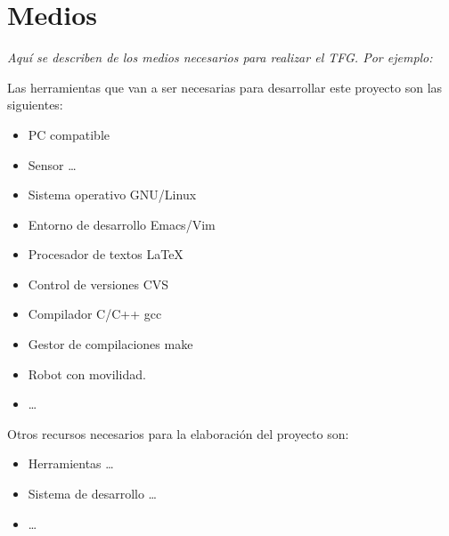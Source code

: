\documentclass{article}
\begin{document}
\section{Medios}
\label{sec:medios}

\textit{Aquí se describen de los medios necesarios para realizar el TFG. Por
  ejemplo:}

Las herramientas que van a ser necesarias para desarrollar este proyecto
son las siguientes:

\begin{itemize}
\item PC compatible
\item Sensor  \ldots
\item Sistema operativo GNU/Linux~\cite{gnulinux}
\item Entorno de desarrollo Emacs/Vim~\cite{emacs}
\item Procesador de textos \LaTeX~\cite{lamport94}
\item Control de versiones CVS~\cite{cvs}
\item Compilador C/C++ gcc~\cite{gcc}
\item Gestor de compilaciones make~\cite{make}
\item Robot con movilidad.
\item  \ldots
\end{itemize}



Otros recursos necesarios para la elaboración del proyecto son:

\begin{itemize}
\item Herramientas  \ldots
\item Sistema de desarrollo  \ldots
\item  \ldots
\end{itemize}
\end{document}
